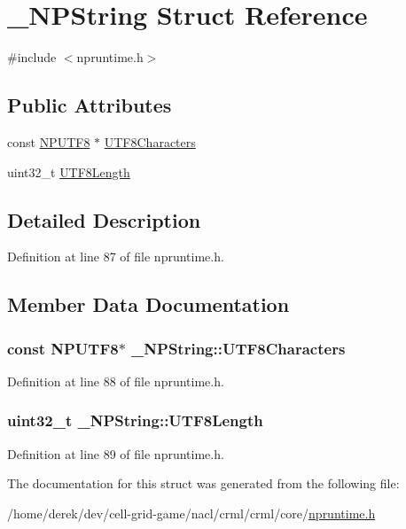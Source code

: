 \hypertarget{struct___n_p_string}{
\section{\_\-NPString Struct Reference}
\label{struct___n_p_string}
}


{\ttfamily \#include $<$npruntime.h$>$}

\subsection*{Public Attributes}
\begin{DoxyCompactItemize}
\item 
const \hyperlink{npruntime_8h_a066f20dfec6b18e91931750b4a7bd65d}{NPUTF8} $\ast$ \hyperlink{struct___n_p_string_a5e6b1c34a19eb86eeb01558e8d09866f}{UTF8Characters}
\item 
uint32\_\-t \hyperlink{struct___n_p_string_a3f802a73c760b2a05173a3d63a56f972}{UTF8Length}
\end{DoxyCompactItemize}


\subsection{Detailed Description}


Definition at line 87 of file npruntime.h.



\subsection{Member Data Documentation}
\hypertarget{struct___n_p_string_a5e6b1c34a19eb86eeb01558e8d09866f}{
\subsubsection[{UTF8Characters}]{\setlength{\rightskip}{0pt plus 5cm}const {\bf NPUTF8}$\ast$ {\bf \_\-NPString::UTF8Characters}}}
\label{struct___n_p_string_a5e6b1c34a19eb86eeb01558e8d09866f}


Definition at line 88 of file npruntime.h.

\hypertarget{struct___n_p_string_a3f802a73c760b2a05173a3d63a56f972}{
\subsubsection[{UTF8Length}]{\setlength{\rightskip}{0pt plus 5cm}uint32\_\-t {\bf \_\-NPString::UTF8Length}}}
\label{struct___n_p_string_a3f802a73c760b2a05173a3d63a56f972}


Definition at line 89 of file npruntime.h.



The documentation for this struct was generated from the following file:\begin{DoxyCompactItemize}
\item 
/home/derek/dev/cell-\/grid-\/game/nacl/crml/crml/core/\hyperlink{npruntime_8h}{npruntime.h}\end{DoxyCompactItemize}
